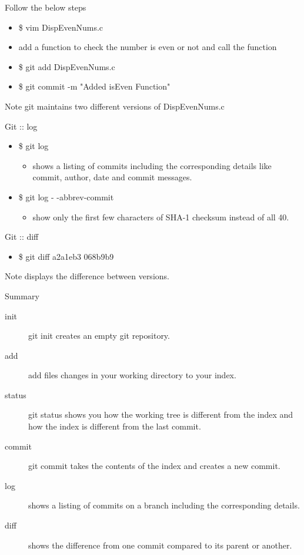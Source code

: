 \documentclass[14pt]{beamer}
\begin{document}
\begin{frame}{Follow the below steps}
\begin{itemize}
\item \$ vim DispEvenNums.c
\item add a function to check the number is even or not and call the function
\item \$ git add DispEvenNums.c
\item \$ git commit -m "Added isEven Function"
\end{itemize}
\begin{block}{Note}
git maintains two different versions of DispEvenNums.c
\end{block}
\end{frame}

\begin{frame}{Git :: log}
\begin{itemize}
\item \$ git log
\begin{itemize}
\item shows a listing of commits including the corresponding details like commit, author, date and commit messages.
\end{itemize}
\item \$ git log - -abbrev-commit
\begin{itemize}
\item show only the first few characters of SHA-1 checksum instead of all 40.
\end{itemize}
\end{itemize}
\end{frame}

\begin{frame}{Git :: diff}
\begin{itemize}
\item \$ git diff a2a1eb3 068b9b9
\end{itemize}
\begin{block}{Note}
displays the difference between versions.
\end{block}
\end{frame}

\begin{frame}{Summary}
\begin{description}
\item[init] git init creates an empty git repository.
\item[add] add files changes in your working directory to your index.
\item[status] git status shows you how the working tree is different from the index and how the index is different from the last commit.
\item[commit] git commit takes the contents of the index and creates a new commit.
\item[log] shows a listing of commits on a branch including the corresponding details.
\item[diff] shows the difference from one commit compared to its parent or another.
\end{description}
\end{frame}
\end{document}
